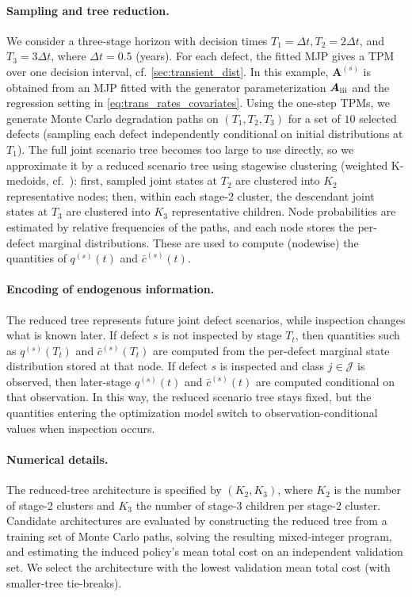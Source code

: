\documentclass{article}
\newcommand{\RN}[1]{\textup{\uppercase\expandafter{\romannumeral#1}}}
\begin{document}
\paragraph{Sampling and tree reduction.}
We consider a three-stage horizon with decision times
$T_1=\Delta t, T_2=2\Delta t$, and $T_3=3\Delta t$, where $\Delta t=0.5$ (years).
For each defect, the fitted MJP gives a TPM over one decision interval, cf. \cref{sec:transient_dist}. In this example, $\bm A^{(s)}$ is obtained from an MJP fitted with the generator parameterization $\bm{A}_{\RN{3}}$ and the regression setting in \cref{eq:trans_rates_covariates}.
Using the one-step TPMs, we generate Monte Carlo degradation paths on $(T_1,T_2,T_3)$ for a set of $10$ selected defects (sampling each defect independently conditional on initial distributions at $T_1$).
The full joint scenario tree becomes too large to use directly, so we approximate it by a reduced scenario tree using stagewise clustering (weighted K-medoids, cf.\ \citet{park2009a}): first, sampled joint states at $T_2$ are clustered into $K_2$ representative nodes; then, within each stage-2 cluster, the descendant joint states at $T_3$ are clustered into $K_3$ representative children.
Node probabilities are estimated by relative frequencies of the paths, and each node stores the per-defect marginal distributions. These are used to compute (nodewise) the quantities of $q^{(s)}(t)$ and $\bar c^{(s)}(t)$.

\paragraph{Encoding of endogenous information.}
The reduced tree represents future joint defect scenarios, while inspection changes what is known later.
If defect $s$ is not inspected by stage $T_t$, then quantities such as $q^{(s)}(T_t)$ and $\bar c^{(s)}(T_t)$ are computed from the per-defect marginal state distribution stored at that node.
If defect $s$ is inspected and class $j\in\mathcal J$ is observed, then later-stage $q^{(s)}(t)$ and $\bar c^{(s)}(t)$ are computed conditional on that observation.
In this way, the reduced scenario tree stays fixed, but the quantities entering the optimization model switch to observation-conditional values when inspection occurs.


\paragraph{Numerical details.}
The reduced-tree architecture is specified by $(K_2,K_3)$, where $K_2$ is the number of stage-2 clusters and $K_3$ the number of stage-3 children per stage-2 cluster.
Candidate architectures are evaluated by constructing the reduced tree from a training set of Monte Carlo paths, solving the resulting mixed-integer program, and estimating the induced policy’s mean total cost on an independent validation set. We select the architecture with the lowest validation mean total cost (with smaller-tree tie-breaks).
\end{document}
